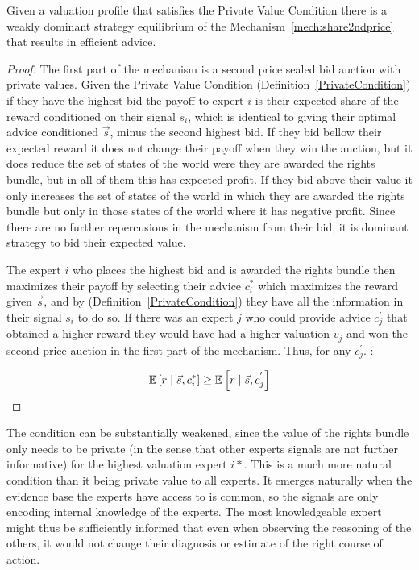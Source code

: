\begin{prop}\label{prop:2ndefficient}
Given a valuation profile that satisfies the Private Value Condition there is a weakly dominant strategy equilibrium of the Mechanism~\ref{mech:share2ndprice} that results in efficient advice.
\end{prop}



\begin{proof}
The first part of the mechanism is a second price sealed bid auction with private values. 
Given the Private Value Condition (Definition~\ref{PrivateCondition}) if they have the highest bid the payoff to expert $i$ is their expected share of the reward conditioned on their signal $s_i$, which is identical to giving their optimal advice conditioned $\vec{s}$, minus the second highest bid.
If they bid bellow their expected reward it does not change their payoff when they win the auction, but it does reduce the set of states of the world were they are awarded the rights bundle, but in all of them this has expected profit. If they bid above their value it only increases the set of states of the world in which they are awarded the rights bundle but only in those states of the world where it has negative profit. Since there are no further repercusions in the mechanism from their bid, it is dominant strategy to bid their expected value. 

The expert $i$ who places the highest bid and is awarded the rights bundle then maximizes their payoff by selecting their advice $c^*_i$ which maximizes the reward given $\vec{s}$, and by (Definition~\ref{PrivateCondition}) they have all the information in their signal $s_i$ to do so. 
If there was an expert $j$ who could provide advice $c^{'}_j$ that obtained a higher reward they would have had a higher valuation $v_j$ and won the second price auction in the first part of the mechanism. Thus, for any $c^{'}_j$. :

$$
\operatorname*{\mathbb E} \left[r \mid \vec{s}, c^*_i \right]
\geq
\operatorname*{\mathbb E} \left[r \mid \vec{s}, c^{'}_j \right]
$$


\end{proof}

The condition can be substantially weakened, since the value of the rights bundle only needs to be private (in the sense that other experts signals are not further informative) for the highest valuation expert $i*$. This is a much more natural condition than it being private value to all experts. It emerges naturally when the evidence base the experts have access to is common, so the signals are only encoding internal knowledge of the experts. The most knowledgeable expert might thus be sufficiently informed that even when observing the reasoning of the others, it would not change their diagnosis or estimate of the right course of action. 


